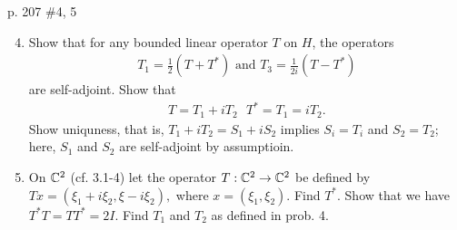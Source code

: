 \documentclass[10pt,a4paper]{report}
\begin{document}
\newpage
p. 207 \#4, 5

\begin{enumerate}
	\setcounter{enumi}{3}
	\item Show that for any bounded linear operator $T$ on $H$, the operators 
	\begin{align*}
		T_1=\frac{1}{2}(T+T^*) \text{  and  } T_3=\frac{1}{2i}(T-T^*)
	\end{align*}are self-adjoint.  Show that 
	\begin{align*}
		T=T_1+iT_2 \text{      } T^*=T_1=iT_2.
	\end{align*}Show uniquness, that is, $T_1+iT_2=S_1+iS_2$ implies $S_i=T_i$ and $S_2=T_2$; here, $S_1$ and $S_2$ are self-adjoint by assumptioin.
	
	\item On $\mathbb{C}^2$ (cf. 3.1-4) let the operator $T: \mathbb{C}^2\to \mathbb{C}^2$ be defined by $Tx=(\xi_1+i\xi_2, \xi-i\xi_2),$ where $x=(\xi_1,\xi_2)$.  Find $T^*$.  Show that we have $T^*T=TT^*=2I$.  Find $T_1$ and $T_2$ as defined in prob. 4.

\end{enumerate}
\end{document}
